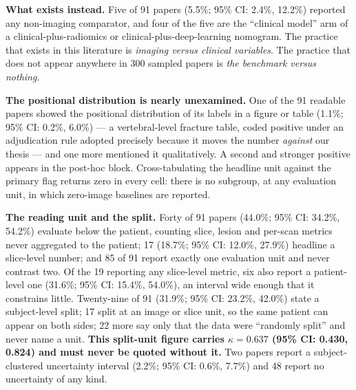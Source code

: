 \documentclass[11pt,a4paper]{article}
\begin{document}
\textbf{What exists instead.} Five of 91 papers (5.5\%; 95\% CI: 2.4\%, 12.2\%)
reported any non-imaging comparator, and four of the five are the ``clinical
model'' arm of a clinical-plus-radiomics or clinical-plus-deep-learning nomogram.
The practice that exists in this literature is \emph{imaging versus clinical
variables}. The practice that does not appear anywhere in 300 sampled papers is
\emph{the benchmark versus nothing}.

\textbf{The positional distribution is nearly unexamined.} One of the 91 readable
papers showed the positional distribution of its labels in a figure or table
(1.1\%; 95\% CI: 0.2\%, 6.0\%) --- a vertebral-level fracture table, coded
positive under an adjudication rule adopted precisely because it moves the number
\emph{against} our thesis --- and one more mentioned it qualitatively. A second
and stronger positive appears in the post-hoc block. Cross-tabulating the
headline unit against the primary flag returns zero in every cell: there is no
subgroup, at any evaluation unit, in which zero-image baselines are reported.

\textbf{The reading unit and the split.} Forty of 91 papers (44.0\%; 95\% CI:
34.2\%, 54.2\%) evaluate below the patient, counting slice, lesion and per-scan
metrics never aggregated to the patient; 17 (18.7\%; 95\% CI: 12.0\%, 27.9\%)
headline a slice-level number; and 85 of 91 report exactly one evaluation unit
and never contrast two. Of the 19 reporting any slice-level metric, six also
report a patient-level one (31.6\%; 95\% CI: 15.4\%, 54.0\%), an interval wide
enough that it constrains little. Twenty-nine of 91 (31.9\%; 95\% CI: 23.2\%,
42.0\%) state a subject-level split; 17 split at an image or slice unit, so the
same patient can appear on both sides; 22 more say only that the data were
``randomly split'' and never name a unit. \textbf{This split-unit figure carries
$\kappa=0.637$ (95\% CI: 0.430, 0.824) and must never be quoted without it.} Two
papers report a subject-clustered uncertainty interval (2.2\%; 95\% CI: 0.6\%,
7.7\%) and 48 report no uncertainty of any kind.
\end{document}
